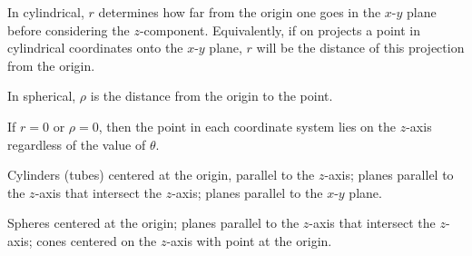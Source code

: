 \printconcepts

{In cylindrical, $r$ determines how far from the origin one goes in the $x$-$y$ plane before considering the $z$-component. Equivalently, if on projects a point in cylindrical coordinates onto the $x$-$y$ plane, $r$ will be the distance of this projection from the origin.

In spherical, $\rho$ is the distance from the origin to the point.}

{If $r=0$ or $\rho=0$, then the point in each coordinate system lies on the $z$-axis regardless of the value of $\theta$.}

{Cylinders (tubes) centered at the origin, parallel to the $z$-axis; planes parallel to the $z$-axis that intersect the $z$-axis; planes parallel to the $x$-$y$ plane.}

{Spheres centered at the origin; planes parallel to the $z$-axis that intersect the $z$-axis; cones centered on the $z$-axis with point at the origin.}

\printproblems














